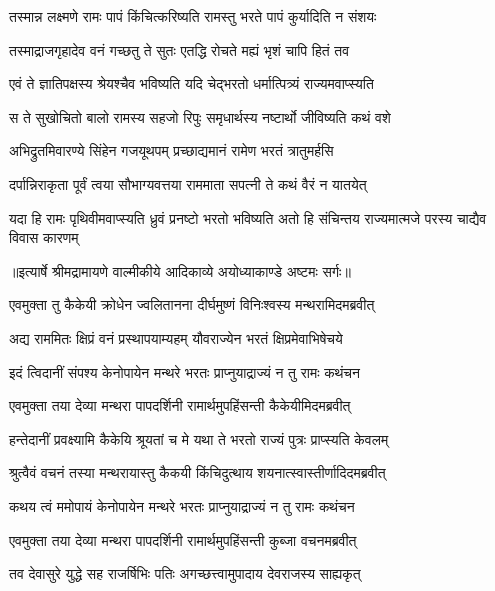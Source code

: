\twolineshloka
{तस्मान्न लक्ष्मणे रामः पापं किंचित्करिष्यति}
{रामस्तु भरते पापं कुर्यादिति न संशयः} %

\twolineshloka
{तस्माद्राजगृहादेव वनं गच्छतु ते सुतः}
{एतद्धि रोचते मह्यं भृशं चापि हितं तव} %

\twolineshloka
{एवं ते ज्ञातिपक्षस्य श्रेयश्चैव भविष्यति}
{यदि चेद्भरतो धर्मात्पित्र्यं राज्यमवाप्स्यति} %

\twolineshloka
{स ते सुखोचितो बालो रामस्य सहजो रिपुः}
{समृधार्थस्य नष्टार्थो जीविष्यति कथं वशे} %

\twolineshloka
{अभिद्रुतमिवारण्ये सिंहेन गजयूथपम्}
{प्रच्छाद्यमानं रामेण भरतं त्रातुमर्हसि} %

\twolineshloka
{दर्पान्निराकृता पूर्वं त्वया सौभाग्यवत्तया}
{राममाता सपत्नी ते कथं वैरं न यातयेत्} %

\fourlineindentedshloka
{यदा हि रामः पृथिवीमवाप्स्यति}
{ ध्रुवं प्रनष्टो भरतो भविष्यति}
{अतो हि संचिन्तय राज्यमात्मजे}
{ परस्य चाद्यैव विवास कारणम्} %


{॥इत्यार्षे श्रीमद्रामायणे वाल्मीकीये आदिकाव्ये अयोध्याकाण्डे अष्टमः सर्गः॥}


\twolineshloka
{एवमुक्ता तु कैकेयी क्रोधेन ज्वलितानना}
{दीर्घमुष्णं विनिःश्वस्य मन्थरामिदमब्रवीत्} %

\twolineshloka
{अद्य राममितः क्षिप्रं वनं प्रस्थापयाम्यहम्}
{यौवराज्येन भरतं क्षिप्रमेवाभिषेचये} %

\twolineshloka
{इदं त्विदानीं संपश्य केनोपायेन मन्थरे}
{भरतः प्राप्नुयाद्राज्यं न तु रामः कथंचन} %

\twolineshloka
{एवमुक्ता तया देव्या मन्थरा पापदर्शिनी}
{रामार्थमुपहिंसन्ती कैकेयीमिदमब्रवीत्} %

\twolineshloka
{हन्तेदानीं प्रवक्ष्यामि कैकेयि श्रूयतां च मे}
{यथा ते भरतो राज्यं पुत्रः प्राप्स्यति केवलम्} %

\twolineshloka
{श्रुत्वैवं वचनं तस्या मन्थरायास्तु कैकयी}
{किंचिदुत्थाय शयनात्स्वास्तीर्णादिदमब्रवीत्} %

\twolineshloka
{कथय त्वं ममोपायं केनोपायेन मन्थरे}
{भरतः प्राप्नुयाद्राज्यं न तु रामः कथंचन} %

\twolineshloka
{एवमुक्ता तया देव्या मन्थरा पापदर्शिनी}
{रामार्थमुपहिंसन्ती कुब्जा वचनमब्रवीत्} %

\twolineshloka
{तव देवासुरे युद्धे सह राजर्षिभिः पतिः}
{अगच्छत्त्वामुपादाय देवराजस्य साह्यकृत्} %

